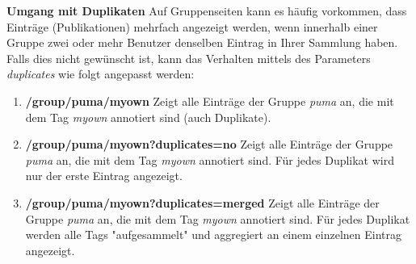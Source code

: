 \documentclass[a4paper,11pt,twoside]{scrbook}
\begin{document}
\textbf{Umgang mit Duplikaten}\newline
Auf Gruppenseiten kann es häufig vorkommen, dass Einträge (Publikationen) mehrfach angezeigt werden, wenn innerhalb einer Gruppe zwei oder mehr Benutzer denselben Eintrag in Ihrer Sammlung haben.\newline
Falls dies nicht gewünscht ist, kann das Verhalten mittels des Parameters \textit{duplicates} wie folgt angepasst werden:
\begin{enumerate}
    \item \textbf{/group/puma/myown} \newline
    Zeigt alle Einträge der Gruppe \textit{puma} an, die mit dem Tag \textit{myown} annotiert sind (auch Duplikate).
    \item \textbf{/group/puma/myown?duplicates=no} \newline
    Zeigt alle Einträge der Gruppe \textit{puma} an, die mit dem Tag \textit{myown} annotiert sind. Für jedes Duplikat wird nur der erste Eintrag angezeigt.
    \item \textbf{/group/puma/myown?duplicates=merged} \newline
    Zeigt alle Einträge der Gruppe \textit{puma} an, die mit dem Tag \textit{myown} annotiert sind. Für jedes Duplikat werden alle Tags "aufgesammelt" und aggregiert an einem einzelnen Eintrag angezeigt.
\end{enumerate}
\end{document}
